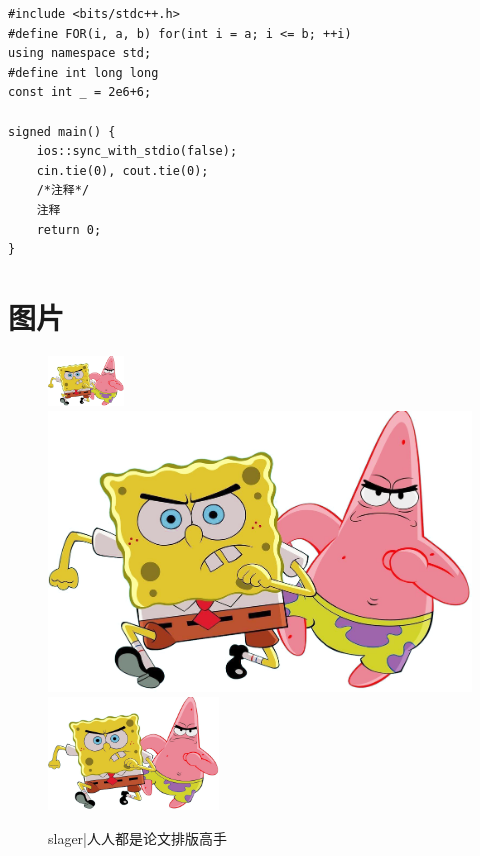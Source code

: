 \documentclass[12pt,A4paper,oneside]{ctexbook}
\begin{document}






\begin{lstlisting}
#include <bits/stdc++.h>
#define FOR(i, a, b) for(int i = a; i <= b; ++i)
using namespace std;
#define int long long
const int _ = 2e6+6;

signed main() {
	ios::sync_with_stdio(false);
	cin.tie(0), cout.tie(0);
	/*注释*/
	注释
	return 0;
}
\end{lstlisting}

\section{图片}

\begin{figure}[h]
	\centering         
	\includegraphics[width=2cm]{figures/spongebob.png} 
	\includegraphics[scale=0.1]{figures/spongebob.png}
	\includegraphics[height=3cm]{figures/spongebob.png} 
	\caption*{slager|人人都是论文排版高手}
\end{figure}
\end{document}
